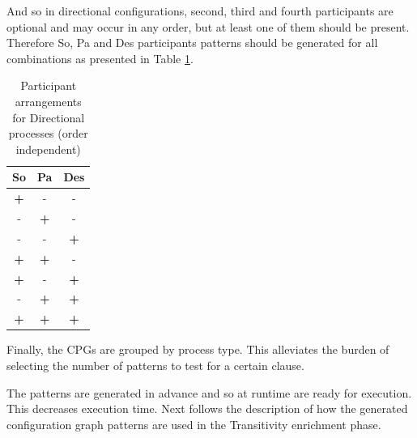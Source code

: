     And so in directional configurations, second, third and fourth participants are optional and may occur in any order, but at least one of them should be present. Therefore So, Pa and Des participants patterns should be generated for all combinations as presented in Table \ref{tab:directional-partic-variations}.

    \begin{table}[!ht]
    	\centering
    	\begin{tabular}{|c|c|c|}
    		\hline
    		\textbf{So} & \textbf{Pa} & \textbf{Des} \\ \hline
    		\textbf{+} & - & - \\ \hline
    		- & \textbf{+} & - \\ \hline
    		- & - & \textbf{+} \\ \hline
    		\textbf{+} & \textbf{+} & - \\ \hline
    		\textbf{+} & - & \textbf{+} \\ \hline
    		- & \textbf{+} & \textbf{+} \\ \hline
    		\textbf{+} & \textbf{+} & \textbf{+} \\ \hline
    	\end{tabular}
    	\caption{Participant arrangements for Directional processes (order independent)}
    	\label{tab:directional-partic-variations}
    \end{table}

    Finally, the CPGs are grouped by process type. This alleviates the burden of selecting the number of patterns to test for a certain clause. 


    The patterns are generated in advance and so at runtime are ready for execution. This decreases execution time. Next follows the description of how the generated configuration graph patterns are used in the Transitivity enrichment phase.

